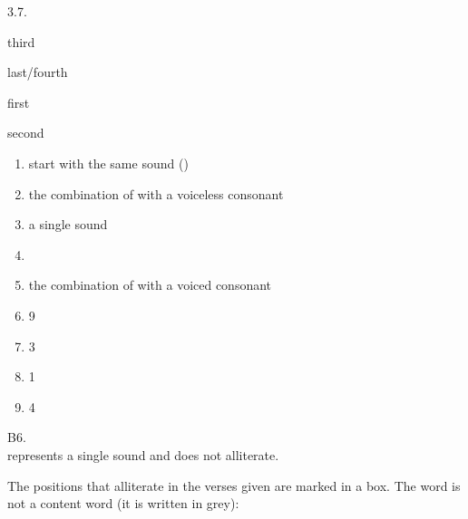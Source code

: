 \begin{refsection}
\begin{practiceproblemsolution}{3.7. \langnameOldNorse}
\begin{solutions}[label=Solution 3.7\alph*]
\begin{enumerate}[label = (\arabic*)]
    \begin{multicols}{2}
        \item third
        \item last/fourth
        \item first
        \item second
        \end{multicols}
    \end{enumerate}
    \pagebreak
    \item
    \begin{enumerate}[label = (\arabic*), start = 5]
        \item start with the same sound ()
        \item the combination of  with a voiceless consonant
        \item a single sound
        \item {}
        \item the combination of  with a voiced consonant
        \item 9
        \item 3
        \item 1
        \item 4
    \end{enumerate}
    \item B6.  \\  represents a single sound and does not alliterate.
\end{solutions}


The positions that alliterate in the verses given are marked in a box. The word  is not a content word (it is written in grey):


\end{practiceproblemsolution}
\end{refsection}
